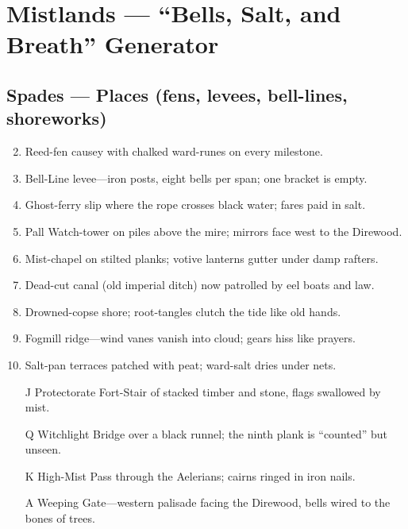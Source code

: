 \chapter{Mistlands --- ``Bells, Salt, and Breath'' Generator}
\label{chap:mistlands}

\section*{Spades --- Places (fens, levees, bell-lines, shoreworks)}
\label{sec:mistlands-places}
\begin{enumerate}
\setcounter{enumi}{1}
\item Reed-fen causey with chalked ward-runes on every milestone.
\item Bell-Line levee---iron posts, eight bells per span; one bracket is empty.
\item Ghost-ferry slip where the rope crosses black water; fares paid in salt.
\item Pall Watch-tower on piles above the mire; mirrors face west to the Direwood.
\item Mist-chapel on stilted planks; votive lanterns gutter under damp rafters.
\item Dead-cut canal (old imperial ditch) now patrolled by eel boats and law.
\item Drowned-copse shore; root-tangles clutch the tide like old hands.
\item Fogmill ridge---wind vanes vanish into cloud; gears hiss like prayers.
\item Salt-pan terraces patched with peat; ward-salt dries under nets.
\item[J] Protectorate Fort-Stair of stacked timber and stone, flags swallowed by mist.
\item[Q] Witchlight Bridge over a black runnel; the ninth plank is ``counted'' but unseen.
\item[K] High-Mist Pass through the Aelerians; cairns ringed in iron nails.
\item[A] Weeping Gate---western palisade facing the Direwood, bells wired to the bones of trees.
\end{enumerate}

